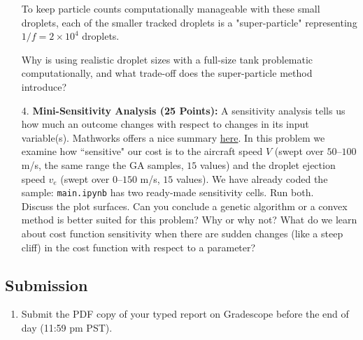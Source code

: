 \documentclass{article}
\begin{document}
\begin{enumerate}
To keep particle counts computationally manageable with these small droplets, each of the smaller tracked droplets is a "super-particle" representing $1/f = 2\times 10^4$ droplets. 

Why is using realistic droplet sizes with a full-size tank problematic computationally, and what trade-off does the super-particle method introduce?

\begin{answer}
\end{answer}

\item[4.] \textbf{Mini-Sensitivity Analysis (25 Points):}
A sensitivity analysis tells us how much an outcome changes with respect to changes in its input variable(s). Mathworks offers a nice summary \href{https://www.mathworks.com/help/sldo/ug/what-is-sensitivity-analysis.html}{here}. In this problem we examine how ``sensitive" our cost is to the aircraft speed $V$ (swept over $50$--$100$ m/s, the same range the GA samples, $15$ values) and the droplet ejection speed $v_e$ (swept over $0$--$150$ m/s, $15$ values). We have already coded the sample: \texttt{main.ipynb} has two ready-made sensitivity cells. Run both. \\
Discuss the plot surfaces. Can you conclude a genetic algorithm or a convex method is better suited for this problem? Why or why not? What do we learn about cost function sensitivity when there are sudden changes (like a steep cliff) in the cost function with respect to a parameter?

\begin{answer}
\end{answer}

\end{enumerate}

\subsection*{Submission}
\begin{enumerate}
    \item Submit the PDF copy of your typed report on Gradescope before the end of day (11:59 pm PST).
\end{enumerate}


\end{document}
